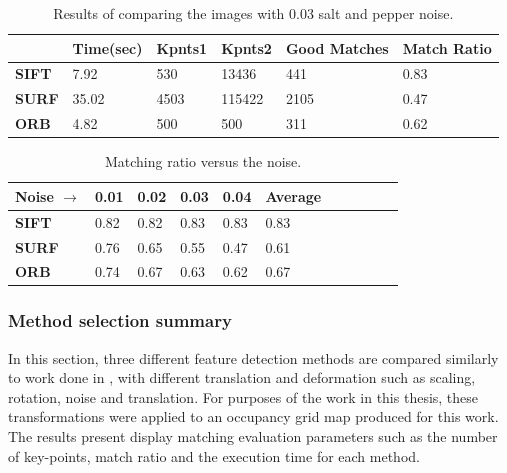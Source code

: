 \begin{table}[H]
\centering
\caption{Results of comparing the images with 0.03 salt and pepper noise.}
\begin{tabular}{ | m{3em} | m{2cm} | m{1.5cm} | m{1.5cm} | m{1.5cm} | m{3cm} | } 
\hline
& \textbf{Time(sec)} & \textbf{Kpnts1}  & \textbf{Kpnts2} & \textbf{Good Matches} & \textbf{Match Ratio}\\ 
\hline
\textbf{SIFT}  & 7.92 & 530 & 13436 & 441 & 0.83\\ 
\hline
\textbf{SURF}  & 35.02 & 4503 & 115422 & 2105 & 0.47\\ 
\hline
\textbf{ORB}  & 4.82 & 500 & 500 & 311 & 0.62\\ 
\hline
\end{tabular}
\label{table:noise}
\end{table}


\begin{table}[H]
\centering
\caption{Matching ratio versus the noise.}
\begin{tabular}{ | m{5em} | m{1cm} | m{1cm} | m{1cm} | m{1cm} | m{1cm} | m{1cm} | m{1cm} | m{1cm} | m{1cm} | m{1cm} | } 
\hline
\textbf{Noise $\rightarrow$ }& \textbf{0.01} & \textbf{0.02} & \textbf{0.03} & \textbf{0.04} & \textbf{Average} \\ 
\hline
\textbf{SIFT}  & 0.82 & 0.82 & 0.83 & 0.83 & 0.83 \\ 
\hline
\textbf{SURF}  & 0.76 & 0.65 & 0.55 & 0.47 & 0.61 \\ 
\hline
\textbf{ORB}  & 0.74 & 0.67 & 0.63 & 0.62 & 0.67  \\ 
\hline
\hline
\end{tabular}
\label{table:noisechange}
\end{table}

\subsubsection{Method selection summary}

In this section, three different feature detection methods are compared similarly to work done in \cite{Karami2015}, with different translation and deformation such as scaling, rotation, noise and translation. For purposes of the work in this thesis, these transformations were applied to an occupancy grid map produced for this work. The results present display matching evaluation parameters such as the number of key-points, match ratio and the execution time for each method. 

